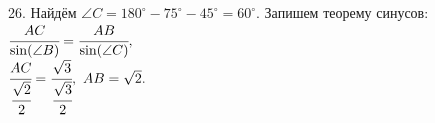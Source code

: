 26. Найдём $\angle C=180^\circ-75^\circ-45^\circ=60^\circ.$ Запишем теорему синусов: $\cfrac{AC}{\sin(\angle B)}=\cfrac{AB}{\sin(\angle C)},$\\$
\cfrac{AC}{\cfrac{\sqrt{2}}{2}}=\cfrac{\sqrt{3}}{\cfrac{\sqrt{3}}{2}},\ AB=\sqrt{2}.$\\

